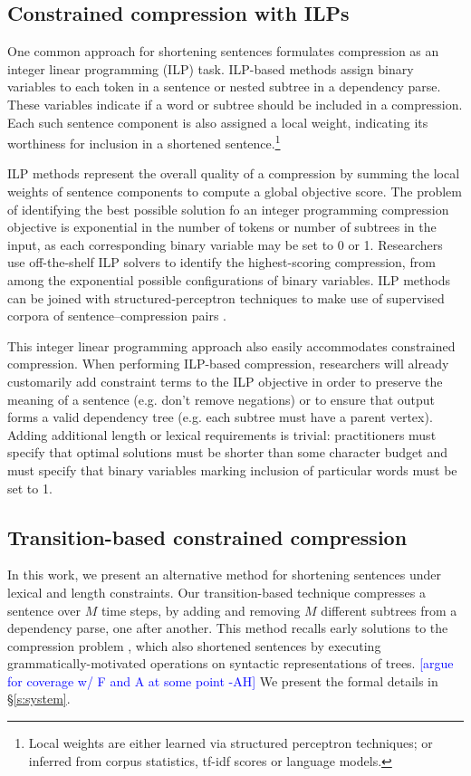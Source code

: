 \documentclass[11pt,a4paper]{article}
\newcommand{\ahcomment}[1]{\textcolor{blue}{[#1 -AH]}}
\begin{document}
\subsection{Constrained compression with ILPs}

One common approach for shortening sentences formulates compression as an integer linear programming (ILP) task. ILP-based methods assign binary variables to each token in a sentence or nested subtree in a dependency parse. These variables indicate if a word or subtree should be included in a compression. Each such sentence component is also assigned a local weight, indicating its worthiness for inclusion in a shortened sentence.\footnote{Local weights are either learned via structured perceptron techniques; or inferred from corpus statistics, tf-idf scores or language models.}

ILP methods represent the overall quality of a compression by summing the local weights of sentence components to compute a global objective score.  The problem of identifying the best possible solution fo an integer programming compression objective is exponential in the number of tokens or number of subtrees in the input, as each corresponding binary variable may be set to 0 or 1. Researchers use off-the-shelf ILP solvers to identify the highest-scoring compression, from among the exponential possible configurations of binary variables. ILP methods can be joined with structured-perceptron techniques to make use of supervised corpora of sentence--compression pairs \cite{filippova2013overcoming}.

This integer linear programming approach also easily accommodates constrained compression. When performing ILP-based compression, researchers will already customarily add constraint terms to the ILP objective in order to preserve the meaning of a sentence (e.g. don't remove negations) or to ensure that output forms a valid dependency tree (e.g. each subtree must have a parent vertex). Adding additional length or lexical requirements is trivial: practitioners must specify that optimal solutions must be shorter than some character budget and must specify that binary variables marking inclusion of particular words must be set to 1. 

\subsection{Transition-based constrained compression}

In this work, we present an alternative method for shortening sentences under lexical and length constraints. Our transition-based technique compresses a sentence over $M$ time steps, by adding and removing $M$ different subtrees from a dependency parse, one after another. This method recalls early solutions to the compression problem \cite{Jing2000SentenceRF,Knight2000StatisticsBasedS}, which also shortened sentences by executing grammatically-motivated operations on syntactic representations of trees. \ahcomment{argue for coverage w/ F and A at some point} We present the formal details in \S\ref{s:system}.
\end{document}
